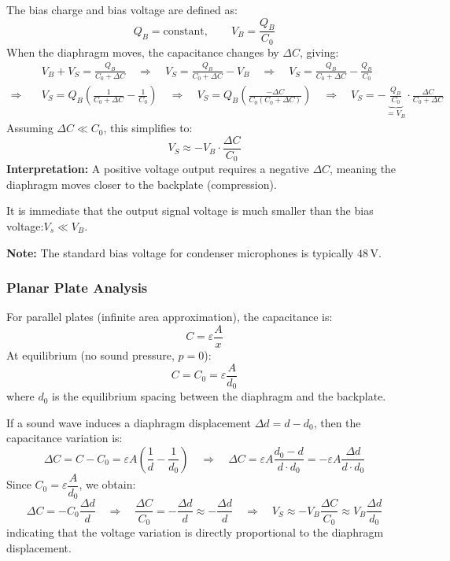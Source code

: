 The bias charge and bias voltage are defined as:
\[
Q_B = \text{constant}, \qquad
V_B = \dfrac{Q_B}{C_0}
\]
When the diaphragm moves, the capacitance changes by \( \Delta C \), giving:
\begin{align*}
    & V_B + V_S = \frac{Q_B}{C_0 + \Delta C}
\quad \Rightarrow \quad
V_S = \frac{Q_B}{C_0 + \Delta C} - V_B 
\quad \Rightarrow \quad
V_S= \frac{Q_B}{C_0 + \Delta C} - \frac{Q_B}{C_0}
\\
\Rightarrow \quad & V_S  = Q_B \left( \frac{1}{C_0 + \Delta C} - \frac{1}{C_0} \right)
\quad \Rightarrow \quad
V_S = Q_B \left( \frac{-\Delta C}{ C_0 \left(C_0 + \Delta C\right)}\right) 
\quad \Rightarrow \quad
V_S = -\underbrace{\frac{Q_B}{C_0}}_{=V_B} \cdot \frac{\Delta C}{C_0 + \Delta C} 
\end{align*}
Assuming \( \Delta C \ll C_0 \), this simplifies to:
\[
V_S \approx -V_B \cdot \frac{\Delta C}{C_0}
\]
\textbf{Interpretation:}  
A positive voltage output requires a negative \( \Delta C \), meaning the diaphragm moves closer to the backplate (compression).

It is immediate that the output signal voltage is much smaller than the bias voltage:$ V_s \ll V_B $.

\textbf{Note:} The standard bias voltage for condenser microphones is typically \( 48\,\text{V} \).


\subsubsection{Planar Plate Analysis}
For parallel plates (infinite area approximation), the capacitance is:
\[
C = \varepsilon \frac{A}{x}
\]
At equilibrium (no sound pressure, \( p = 0 \)):
\[
C = C_0 = \varepsilon \frac{A}{d_0}
\]
where \( d_0 \) is the equilibrium spacing between the diaphragm and the backplate.

\bigskip
If a sound wave induces a diaphragm displacement \( \Delta d = d - d_0 \), then the capacitance variation is:
\[
\Delta C = C - C_0 = \varepsilon A \left( \frac{1}{d} - \frac{1}{d_0} \right)
\quad \Rightarrow \quad 
\Delta C= \varepsilon A \frac{d_0 - d}{d \cdot d_0}
= -\varepsilon A \frac{\Delta d}{d \cdot d_0}
\]
Since \( C_0 = \varepsilon \dfrac{A}{d_0} \), we obtain:
\[
\Delta C = -C_0 \frac{\Delta d}{d}
\quad \Rightarrow \quad 
\frac{\Delta C}{C_0} = -\frac{\Delta d}{d} \approx -\frac{\Delta d}{d}
\quad  \Rightarrow \quad
V_S \approx -V_B \frac{\Delta C}{C_0} \approx V_B \frac{\Delta d}{d_0}
\]
indicating that the voltage variation is directly proportional to the diaphragm displacement.


